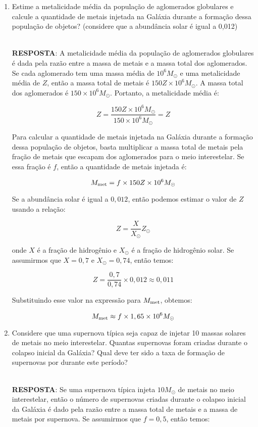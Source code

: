 \documentclass[a4paper,12pt]{article}
\begin{document}
\begin{enumerate}
\begin{enumerate}
\noindent\hrulefill

\item Estime a metalicidade média da população de aglomerados globulares e calcule a quantidade de metais injetada na Galáxia durante a formação dessa população de objetos? (considere que a abundância solar é igual a 0,012)

\noindent\hrulefill\\\textbf{RESPOSTA}: A metalicidade média da população de aglomerados globulares é dada pela razão entre a massa de metais e a massa total dos aglomerados. Se cada aglomerado tem uma massa média de $10^6 M_\odot$ e uma metalicidade média de $Z$, então a massa total de metais é $150 Z \times 10^6 M_\odot$. A massa total dos aglomerados é $150 \times 10^6 M_\odot$. Portanto, a metalicidade média é:

$$Z = \frac{150 Z \times 10^6 M_\odot}{150 \times 10^6 M_\odot} = Z$$

Para calcular a quantidade de metais injetada na Galáxia durante a formação dessa população de objetos, basta multiplicar a massa total de metais pela fração de metais que escapam dos aglomerados para o meio interestelar. Se essa fração é $f$, então a quantidade de metais injetada é:

$$M_{\rm met} = f \times 150 Z \times 10^6 M_\odot$$

Se a abundância solar é igual a $0,012$, então podemos estimar o valor de $Z$ usando a relação:

$$Z = \frac{X}{X_\odot} Z_\odot$$

onde $X$ é a fração de hidrogênio e $X_\odot$ é a fração de hidrogênio solar. Se assumirmos que $X = 0,7$ e $X_\odot = 0,74$, então temos:

$$Z = \frac{0,7}{0,74} \times 0,012 \approx 0,011$$

Substituindo esse valor na expressão para $M_{\rm met}$, obtemos:

$$M_{\rm met} \approx f \times 1,65 \times 10^6 M_\odot$$

\noindent\hrulefill

\item Considere que uma supernova típica seja capaz de injetar 10 massas solares de metais no meio interestelar. Quantas supernovas foram criadas durante o colapso inicial da Galáxia? Qual deve ter sido a taxa de formação de supernovas por durante este período?

\noindent\hrulefill\\\textbf{RESPOSTA}: Se uma supernova típica injeta $10 M_\odot$ de metais no meio interestelar, então o número de supernovas criadas durante o colapso inicial da Galáxia é dado pela razão entre a massa total de metais e a massa de metais por supernova. Se assumirmos que $f = 0,5$, então temos:


\end{enumerate}
\end{enumerate}
\end{document}
